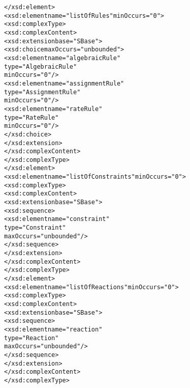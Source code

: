 \begin{alltt}
                    </xsd:element>
                    <xsd:element name="listOfRules" minOccurs="0">
                        <xsd:complexType>
                            <xsd:complexContent>
                                <xsd:extension base="SBase">
                                    <xsd:choice maxOccurs="unbounded">
                                        <xsd:element name="algebraicRule" 
                                                     type="AlgebraicRule" 
                                                     minOccurs="0"/>
                                        <xsd:element name="assignmentRule" 
                                                     type="AssignmentRule" 
                                                     minOccurs="0"/>
                                        <xsd:element name="rateRule" 
                                                     type="RateRule" 
                                                     minOccurs="0"/>
                                    </xsd:choice>
                                </xsd:extension>
                            </xsd:complexContent>
                        </xsd:complexType>
                    </xsd:element>
                    <xsd:element name="listOfConstraints" minOccurs="0">
                        <xsd:complexType>
                            <xsd:complexContent>
                                <xsd:extension base="SBase">
                                    <xsd:sequence>
                                        <xsd:element name="constraint" 
                                                     type="Constraint" 
                                                     maxOccurs="unbounded"/>
                                    </xsd:sequence>
                                </xsd:extension>
                            </xsd:complexContent>
                        </xsd:complexType>
                    </xsd:element>
                    <xsd:element name="listOfReactions" minOccurs="0">
                        <xsd:complexType>
                            <xsd:complexContent>
                                <xsd:extension base="SBase">
                                    <xsd:sequence>
                                        <xsd:element name="reaction" 
                                                     type="Reaction" 
                                                     maxOccurs="unbounded"/>
                                    </xsd:sequence>
                                </xsd:extension>
                            </xsd:complexContent>
                        </xsd:complexType>

\end{alltt}
